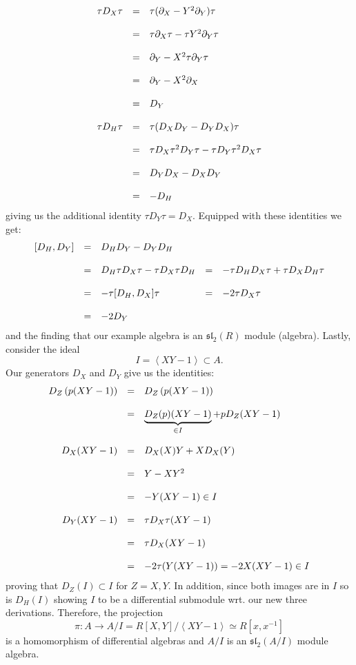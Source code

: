 $$\bao{rcl}
\tau D_X \tau &=& \tau (\partial_X - Y^2 \partial_Y) \tau\\
&&\\
&=& \tau \partial_X \tau - \tau Y^2 \partial_Y \tau\\
&&\\
&=& \partial_Y - X^2 \tau \partial_Y \tau\\
&&\\
&=& \partial_Y - X^2 \partial_X\\
&&\\
&=& D_Y\\
&&\\
\tau D_H \tau &=& \tau (D_X D_Y - D_Y D_X) \tau \\
&&\\
&=& \tau D_X \tau^2 D_Y \tau - \tau D_Y \tau^2 D_X \tau\\
&&\\
&=& D_Y D_X - D_X D_Y\\
&&\\
&=& - D_H
\ea$$
giving us the additional identity $\tau D_Y \tau = D_X$. Equipped with these identities we get:
$$\bao{rclcl}
[D_H,D_Y] &=& D_H D_Y - D_Y D_H\\
&&\\
&=& D_H \tau D_X \tau - \tau D_X \tau D_H
&=& - \tau D_H D_X \tau + \tau D_X D_H \tau\\
&&\\
&=& - \tau [D_H,D_X] \tau
&=& -2 \tau D_X \tau\\
&&\\
&=& -2 D_Y\\
\ea$$
and the finding that our example algebra is an $\mathfrak{sl}_2(R)$ module (algebra). Lastly, consider the ideal
$$ I = \left<X Y - 1\right> \subset A.$$
Our generators $D_X$ and $D_Y$ give us the identities:
$$\bao{rcl}
D_Z\left( p (X Y - 1)\right) &=&  D_Z\left(p (X Y - 1)\right)\\
&&\\
&=& \underbrace{D_Z(p) (X Y - 1)}_{\in I} + p D_Z(X Y - 1)\\
&&\\
D_X(X Y - 1) &=& D_X(X) Y + X D_X(Y)\\
&&\\
&=& Y - X Y^2\\
&&\\
&=& -Y (X Y - 1) \in I\\
\\
D_Y(X Y - 1) &=& \tau D_X \tau(X Y - 1)\\
&&\\
&=& \tau D_X(X Y - 1)\\
&&\\
&=& -2 \tau (Y(X Y - 1)) = -2 X (X Y - 1) \in I\\
\ea$$
proving that $D_Z(I) \subset I$ for $Z = X, Y$. In addition, since both images are in $I$ so is $D_H(I)$ showing $I$ to be a differential submodule wrt. our new three derivations. Therefore, the projection
$$\pi : A \longrightarrow A/I = R[X,Y]/\left<X Y - 1\right> \simeq R[x,x^{-1}]$$
is a homomorphism of differential algebras and $A/I$ is an $\mathfrak{sl}_2(A/I)$ module algebra.
\begin{defi}

\end{defi}
